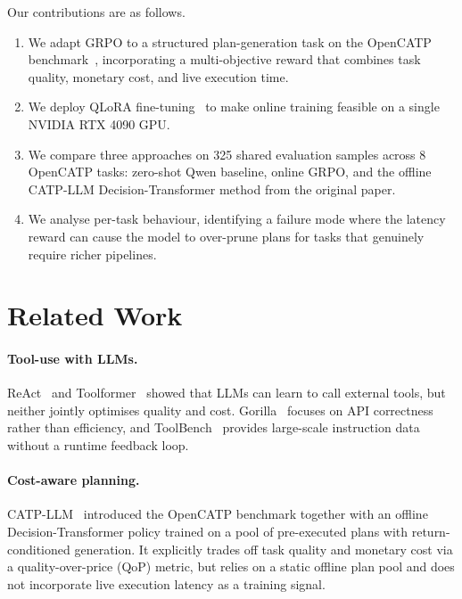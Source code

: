 \documentclass[10pt,twocolumn]{article}
\begin{document}
Our contributions are as follows.
\begin{enumerate}
  \item We adapt GRPO to a structured plan-generation task on the
        OpenCATP benchmark~\cite{openCATPlm2024}, incorporating a multi-objective
        reward that combines task quality, monetary cost, and live execution time.
  \item We deploy QLoRA fine-tuning~\cite{dettmers2023qlora} to make
        online training feasible on a single NVIDIA RTX 4090 GPU.
  \item We compare three approaches on 325 shared evaluation samples across
        8 OpenCATP tasks: zero-shot Qwen baseline, online GRPO, and the
        offline CATP-LLM Decision-Transformer method from the original paper.
  \item We analyse per-task behaviour, identifying a failure mode where the
        latency reward can cause the model to over-prune plans for tasks that
        genuinely require richer pipelines.
\end{enumerate}


\section{Related Work}

\paragraph{Tool-use with LLMs.}
ReAct~\cite{yao2022react} and Toolformer~\cite{schick2023toolformer} showed
that LLMs can learn to call external tools, but neither jointly optimises
quality and cost.
Gorilla~\cite{patil2023gorilla} focuses on API correctness rather than
efficiency, and ToolBench~\cite{qin2023toolbench} provides large-scale
instruction data without a runtime feedback loop.

\paragraph{Cost-aware planning.}
CATP-LLM~\cite{openCATPlm2024} introduced the OpenCATP benchmark together
with an offline Decision-Transformer policy trained on a pool of pre-executed
plans with return-conditioned generation.
It explicitly trades off task quality and monetary cost via a
quality-over-price (QoP) metric, but relies on a static offline plan pool
and does not incorporate live execution latency as a training signal.
\end{document}

